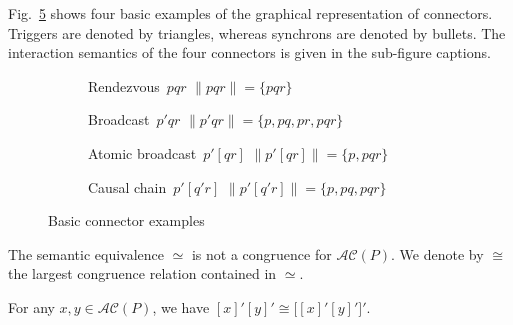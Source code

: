 \documentclass{llncs}
\newcommand{\fig}[1]{Fig.~\ref{fig:#1}}
\newcommand{\intsem}[1]{\ensuremath{\|{#1}\|}}
\newcommand{\ac}{\ensuremath{\mathcal{AC}}}
\begin{document}
\fig{connectors} shows four basic examples of the graphical
representation of connectors.  Triggers are denoted by triangles,
whereas synchrons are denoted by bullets.  The interaction semantics
of the four connectors is given in the sub-figure captions.

\begin{figure}[t]
  \centering
  \begin{subfigure}[b]{0.18\textwidth}
    \centering
    
    \caption{\centering Rendezvous~$pqr$
      $\intsem{pqr} = \{pqr\}$}
    \label{fig:connectors:rdv}
  \end{subfigure}%
  \hfill %
  \begin{subfigure}[b]{0.24\textwidth}
    \centering
    
    \caption{\centering Broadcast~$p'qr$
      $\intsem{p'qr} = \{p, pq, pr, pqr\}$}
    \label{fig:connectors:bdc}
  \end{subfigure}%
  \hfill %
  \begin{subfigure}[b]{0.24\textwidth}
    \centering
    
    \caption{\centering Atomic broadcast~$p'[qr]$
      $\intsem{p'[qr]} = \{p, pqr\}$}
    \label{fig:connectors:atomic}
  \end{subfigure}%
  \hfill %
  \begin{subfigure}[b]{0.23\textwidth}
    \centering
    
    \caption{\centering Causal chain~$p'[q'r]$
      $\intsem{p'[q'r]} = \{p, pq, pqr\}$}
    \label{fig:connectors:causal}
  \end{subfigure}%
  \caption{Basic connector examples}
  \label{fig:connectors}
\end{figure}

The semantic equivalence $\simeq$ is not a congruence for $\ac(P)$.
We denote by $\cong$ the largest congruence relation contained in
$\simeq$.

\begin{property}
  \label{prop:cong}
  For any $x, y \in \ac(P)$, we have $[x]'[y]' \cong \bigl[[x]'[y]'\bigr]'$.
\end{property}
\end{document}
